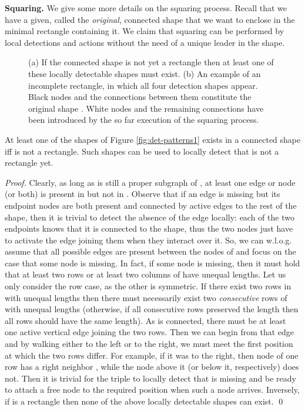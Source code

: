 \documentclass[oribibl, 11pt]{llncs}
\begin{document}
\noindent\textbf{Squaring.} We give some more details on the squaring process. Recall that we have a given, called the \emph{original}, connected shape  that we want to enclose in the minimal rectangle  containing it. We claim that squaring can be performed by local detections and actions without the need of a unique leader in the shape. 

\begin{figure}[!hbtp]
   \caption{(a) If the connected shape is not yet a rectangle then at least one of these locally detectable shapes must exist. (b) An example of an incomplete rectangle, in which all four detection shapes appear. Black nodes and the connections between them constitute the original shape . White nodes and the remaining connections have been introduced by the so far execution of the squaring process.} \label{fig:det-patterns}
\end{figure}

\begin{proposition}
At least one of the shapes of Figure \ref{fig:det-patterns1} exists in a connected shape  iff  is not a rectangle. Such shapes can be used to locally detect that  is not a rectangle yet.
\end{proposition}
\begin{proof}
Clearly, as long as  is still a proper subgraph of , at least one edge or node (or both) is present in  but not in . Observe that if an edge is missing but its endpoint nodes are both present and connected by active edges to the rest of the shape, then it is trivial to detect the absence of the edge locally: each of the two endpoints knows that it is connected to the shape, thus the two nodes just have to activate the edge joining them when they interact over it. So, we can w.l.o.g. assume that all possible edges are present between the nodes of  and focus on the case that some node is missing. In fact, if some node is missing, then it must hold that at least two rows or at least two columns of  have unequal lengths. Let us only consider the row case, as the other is symmetric. If there exist two rows in  with unequal lengths then there must necessarily exist two \emph{consecutive} rows of  with unequal lengths (otherwise, if all consecutive rows preserved the length then all rows should have the same length). As  is connected, there must be at least one active vertical edge joining the two rows. Then we can begin from that edge and by walking either to the left or to the right, we must meet the first position at which the two rows differ. For example, if it was to the right, then node  of one row has a right neighbor , while the node  above it (or below it, respectively) does not. Then it is trivial for the triple  to locally detect that  is missing and be ready to attach a free node to the required position when such a node arrives. Inversely, if  is a rectangle then none of the above locally detectable shapes can exist.
\qed
\end{proof}
\end{document}
